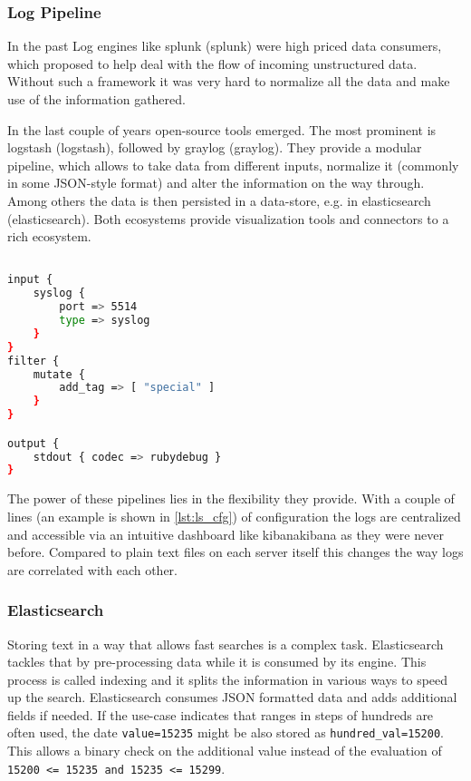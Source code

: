 \subsubsection{Log Pipeline}
In the past Log engines like \gls{splunk} (\glsdesc{splunk}) were high priced data consumers, which proposed to help deal with the
flow of incoming unstructured data. Without such a framework it was very hard to normalize all the data and make use of the information gathered.

In the last couple of years open-source tools emerged. The most prominent is \gls{logstash} (\glsdesc{logstash}),
followed by \gls{graylog} (\glsdesc{graylog}).
They provide a modular pipeline, which allows to take data from different inputs, normalize it (commonly in some JSON-style format)
and alter the information on the way through. Among others the data is then persisted in a data-store, e.g. in \gls{elasticsearch} (\glsdesc{elasticsearch}).
Both ecosystems provide visualization tools and connectors to a rich ecosystem.

\begin{lstlisting}[language=bash,label={lst:ls_cfg},
    caption={Basic Logstash configuration}]

input {
    syslog {
        port => 5514
        type => syslog
    }
}
filter {
    mutate {
        add_tag => [ "special" ]
    }
}

output {
    stdout { codec => rubydebug }
}
\end{lstlisting}

The power of these pipelines lies in the flexibility they provide. With a couple of lines (an example is shown in \autoref{lst:ls_cfg}) of
configuration the logs are centralized and accessible via an intuitive dashboard like \gls{kibana}\glsdesc{kibana} as they were never before. Compared to plain text files on each server itself this changes the way logs are correlated with each other.

\subsubsection{Elasticsearch}
Storing text in a way that allows fast searches is a complex task. Elasticsearch tackles that by pre-processing data while it is consumed by its engine.
This process is called indexing and it splits the information in various ways to speed up the search.
Elasticsearch consumes JSON formatted data and adds additional fields if needed.
If the use-case indicates that ranges in steps of hundreds are often used, the date \lstinline{value=15235} might be also stored
as \lstinline{hundred_val=15200}. This allows a binary check on the additional value instead of the evaluation of \lstinline{15200 <= 15235 and 15235 <= 15299}.

